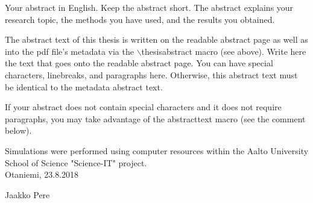 \documentclass[english,12pt,a4paper,pdftex,sci,utf8]{aaltothesis} %
\date{23.8.2018}
\begin{document}
\makecoverpage

\makecopyrightpage


\begin{abstractpage}[english]
  Your abstract in English. Keep the abstract short. The abstract explains your
  research topic, the methods you have used, and the results you obtained.  
  
  The abstract text of this thesis is written on the readable abstract page as
  well as into the pdf file's metadata via the $\backslash$thesisabstract macro
  (see above). Write here the text that goes onto the readable abstract page.
  You can have special characters, linebreaks, and paragraphs here. Otherwise,
  this abstract text must be identical to the metadata abstract text.
  
  If your abstract does not contain special characters and it does not require
  paragraphs, you may take advantage of the abstracttext macro (see the comment
  below).
\end{abstractpage}






Simulations were performed using computer resources within the Aalto University School of Science "Science-IT" project.\\

\vspace{5cm}
Otaniemi, 23.8.2018

\vspace{5mm}
{\hfill Jaakko Pere \hspace{1cm}}
\end{document}
